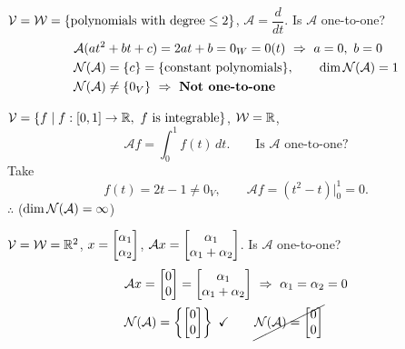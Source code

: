 \begin{example}\leavevmode{}
$\mathcal{V}=\mathcal{W}=\{\text{polynomials with degree}\le 2\}$, \quad $\mathcal{A}=\dfrac{d}{dt}$. \quad Is $\mathcal{A}$ one-to-one?
\begin{align*}
&\mathcal{A}(at^2+bt+c)=2at+b=0_W=0(t) \ \Rightarrow\ a=0,\ b=0\\
&\mathcal{N}(\mathcal{A})=\{c\}=\{\text{constant polynomials}\}, \qquad \dim\mathcal{N}(\mathcal{A})=1\\
&\mathcal{N}(\mathcal{A})\ne\{0_V\}\ \Rightarrow\ \text{\textbf{Not one-to-one}}
\end{align*}
\end{example}

\begin{example}\label{ex:integral-not-1-1}
$\mathcal{V}=\{f\mid f:[0,1]\to\mathbb{R},\ f \text{ is integrable}\}$, \quad $\mathcal{W}=\mathbb{R}$,
\[
\mathcal{A}f=\int_0^1 f(t)\,dt. \qquad\text{Is } \mathcal{A} \text{ one-to-one?}
\]
Take
\[
f(t)=2t-1\ne 0_V, \qquad \mathcal{A}f=\left(t^2-t\right)\Big|_0^1=0.
\]
$\therefore$  \quad ($\dim\mathcal{N}(\mathcal{A})=\infty$)
\end{example}

\begin{example}
$\mathcal{V}=\mathcal{W}=\mathbb{R}^2$, \quad $x=\begin{bmatrix}\alpha_1\\ \alpha_2\end{bmatrix}$, \quad $\mathcal{A}x=\begin{bmatrix}\alpha_1\\ \alpha_1+\alpha_2\end{bmatrix}$. \quad Is $\mathcal{A}$ one-to-one?
\begin{align*}
&\mathcal{A}x=\bmat{0\\0}=\bmat{\alpha_1\\ \alpha_1+\alpha_2} \ \Rightarrow\ \alpha_1=\alpha_2=0\\
&\Null(\mathcal{A})=\left\{\bmat{0\\0}\right\} \ \checkmark \qquad
\cancel{\Null(\mathcal{A})=\bmat{0\\0}}
\end{align*}
\end{example}

